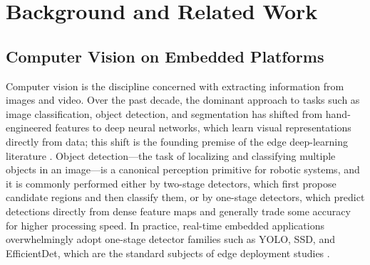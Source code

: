 %

\providecommand{\todo}[1]{\textbf{[TODO: #1]}}

\chapter{Background and Related Work}
\label{chap:background}

\section{Computer Vision on Embedded Platforms}
\label{sec:cv-embedded}

Computer vision is the discipline concerned with extracting information
from images and video. Over the past decade, the dominant approach to
tasks such as image classification, object detection, and segmentation has
shifted from hand-engineered features to deep neural networks, which learn
visual representations directly from data; this shift is the founding
premise of the edge deep-learning literature \cite{xu2025}. Object
detection---the task of localizing and classifying multiple objects in an
image---is a canonical perception primitive for robotic systems, and it is
commonly performed either by two-stage detectors, which first propose
candidate regions and then classify them, or by one-stage detectors, which
predict detections directly from dense feature maps and generally trade
some accuracy for higher processing speed.
In practice, real-time embedded applications overwhelmingly adopt
one-stage detector families such as YOLO, SSD, and EfficientDet, which are
the standard subjects of edge deployment studies
\cite{alqahtani2026, szegedi2026, zequn2026}.

